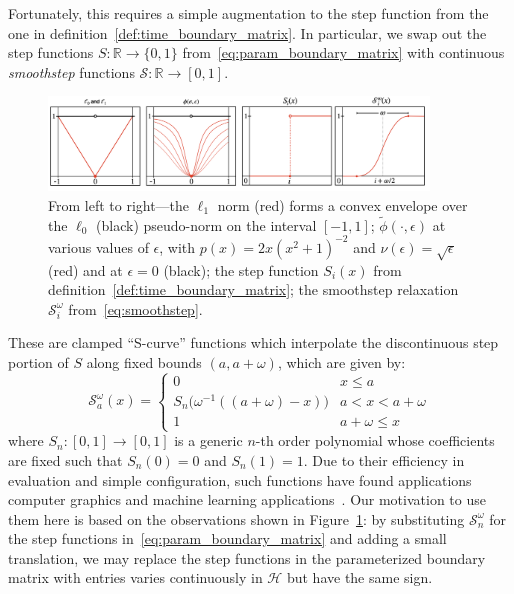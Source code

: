 \documentclass[12pt]{article}
\numberwithin{equation}{section}
\newcommand{\+}{%
	\raisebox{0.18ex}{\scaleobj{0.55}{+}}
}
\theoremstyle{definition}
\begin{document}
Fortunately, this requires a simple augmentation to the step function from the one in definition~\ref{def:time_boundary_matrix}. In particular, we swap out the step functions $S : \mathbb{R} \to \{ 0, 1\}$ from~\eqref{eq:param_boundary_matrix} with continuous \emph{smoothstep} functions $\mathcal{S}: \mathbb{R} \to [0, 1]$. 
\begin{figure}
\centering
	\includegraphics[width=0.90\textwidth]{cont_relax}
	\caption{From left to right---the $\ell_1$ norm (red) forms a convex envelope over the $\ell_0$ (black) pseudo-norm on the interval $[-1, 1]$; 
	$\tilde{\phi}(\cdot, \epsilon)$ at various values of $\epsilon$, with $p(x) = 2x (x^2 + 1)^{-2}$ and $\nu(\epsilon) = \sqrt{\epsilon}$ (red) and at $\epsilon = 0$ (black); 
	the step function $S_i(x)$ from definition~\ref{def:time_boundary_matrix}; 
	the smoothstep relaxation $\mathcal{S}_i^{\omega}$ from~\eqref{eq:smoothstep}.
	}
	\label{fig:smoothstep}
\end{figure}
These are clamped ``S-curve'' functions which interpolate the discontinuous step portion of $S$ along fixed bounds $(a,a+\omega)$, which are given by:  
\begin{equation}\label{eq:smoothstep}
\mathcal{S}_a^{\omega} (x) = \begin{cases}
	0 & x \leq a \\
	S_n\big( \omega^{-1}((a + \omega) - x) \big) & a < x < a + \omega \\
	1 & a + \omega \leq x
\end{cases}
\end{equation} 
where $S_n: [0,1] \to [0,1]$ is a generic $n$-th order polynomial whose coefficients are fixed such that $S_n(0) = 0$ and $S_n(1) = 1$.
Due to their efficiency in evaluation and simple configuration, such functions have found applications computer graphics and machine learning applications~\cite{}. 
Our motivation to use them here is based on the observations shown in Figure~\ref{fig:smoothstep}: by substituting $\mathcal{S}_n^{\omega}$ for the step functions 	in~\eqref{eq:param_boundary_matrix} and adding a small translation, we may replace the step functions in the parameterized boundary matrix with entries varies continuously in $\mathcal{H}$ but have the same sign. 
\end{document}
